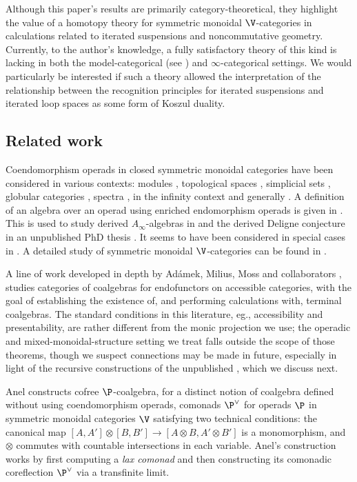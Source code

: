 \documentclass{tac}
\begin{document}
Although this paper's results are primarily category-theoretical, they highlight the value of a homotopy theory for symmetric monoidal $\V$-categories in calculations related to iterated suspensions and noncommutative geometry. Currently, to the author's knowledge, a fully satisfactory theory of this kind is lacking in both the model-categorical (see \cite[Section 5.4]{gillou}) and $\infty$-categorical settings. We would particularly be interested if such a theory allowed the interpretation of the relationship between the recognition principles for iterated suspensions and iterated loop spaces as some form of Koszul duality.

\subsection{Related work}
Coendomorphism operads in closed symmetric monoidal categories have been considered in various contexts: modules \cite{loday12, legrignou20, roca24}, topological spaces \cite{baez17, me1}, simplicial sets  \cite{ofc26},  globular categories \cite{Kachour15, cheng23}, spectra \cite{arone14, malin25}, in the infinity context \cite{petersen26} and generally \cite{batanin09, anel14}.
A definition of an algebra over an operad using enriched endomorphism operads is given in \cite[Section 3]{fresse09}. This is used to study derived $A_{\infty}$-algebras in \cite{cirici18} and the derived Deligne conjecture in an unpublished PhD thesis \cite{Aguilar24}. It seems to have been considered in special cases in \cite{johnson22, yau, chabertier24, Espalungue23}. A detailed study of symmetric monoidal $\V$-categories can be found in \cite{Villoria24}.

A line of work developed in depth by Adámek, Milius, Moss and collaborators \cite{Adamek_Milius_Moss_2025, power01, Aczel89}, studies categories of coalgebras for endofunctors on accessible categories, with the goal of establishing the existence of, and performing calculations with, terminal coalgebras. The standard conditions in this literature, eg., accessibility and presentability, are rather different from the monic projection we use; the operadic and mixed-monoidal-structure setting we treat falls outside the scope of those theorems, though we suspect connections may be made in future, especially in light of the recursive constructions of the unpublished \cite{anel14}, which we discuss next.

Anel constructs cofree
$\P$-coalgebra, for a distinct notion of coalgebra defined without using coendomorphism operads, comonads $\P^{\vee}$ for operads $\P$ in symmetric monoidal
categories $\V$ satisfying two technical conditions: the canonical map
$[A, A'] \otimes [B, B'] \to [A \otimes B, A' \otimes B']$ is a monomorphism,
and $\otimes$ commutes with countable intersections in each variable. Anel's construction works by first computing a \emph{lax comonad} and then constructing its comonadic coreflection $\P^{\vee}$ via a transfinite
limit.
\end{document}

